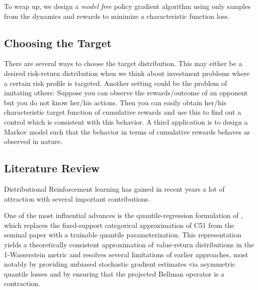 \documentclass[reqno, 11pt]{amsart}%
\theoremstyle{definition}
\begin{document}
 To wrap up, we design a \emph{model free} policy gradient algorithm using only samples from the dynamics and rewards to minimize a characteristic function loss.  

\subsection{Choosing the Target}
There are several ways to choose the target distribution. This may either be a desired risk-return distribution when we think about investment problems where a certain risk profile is targeted. Another setting could be the problem of imitating others: Suppose you can observe the rewards/outcome of an opponent but you do not know her/his actions. Then you can easily obtain her/his characteristic target function of cumulative rewards and use this to find out a control which is consistent with this behavior. A third application is to design a Markov model such that the behavior in terms of cumulative rewards behaves as observed in nature.

\subsection{Literature Review}
Distributional Reinforcement learning has gained in recent years a lot of attraction with several important contributions. 

One of the most influential advances is the quantile-regression formulation of  \cite{dabney2018distributional}, which replaces the fixed-support categorical approximation of C51 from the seminal paper \cite{bellemare2017distributional} with a trainable quantile parameterization. This representation yields a theoretically consistent approximation of value-return distributions in the 1-Wasserstein metric and resolves several limitations of earlier approaches, most notably by providing unbiased stochastic gradient estimates via asymmetric quantile losses and by ensuring that the projected Bellman operator is a contraction.  %
\end{document}
